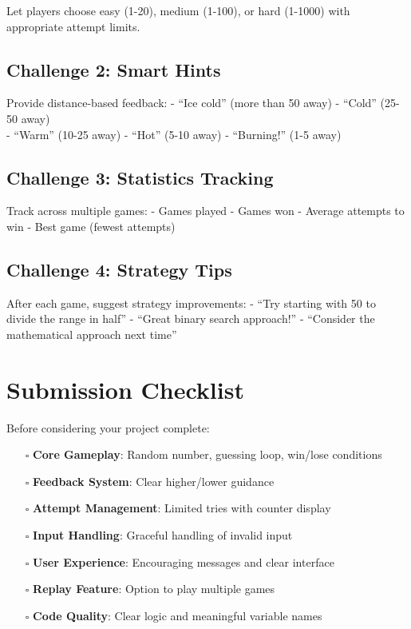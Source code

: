 \documentclass[
  letterpaper,
  DIV=11,
  numbers=noendperiod,
  oneside]{scrreprt}
\providecommand{\tightlist}{%
  \setlength{\itemsep}{0pt}\setlength{\parskip}{0pt}}\usepackage{longtable,booktabs,array}
\begin{document}
Let players choose easy (1-20), medium (1-100), or hard (1-1000) with
appropriate attempt limits.

\subsection{Challenge 2: Smart Hints}\label{challenge-2-smart-hints}

Provide distance-based feedback: - ``Ice cold'' (more than 50 away) -
``Cold'' (25-50 away)\\
- ``Warm'' (10-25 away) - ``Hot'' (5-10 away) - ``Burning!'' (1-5 away)

\subsection{Challenge 3: Statistics
Tracking}\label{challenge-3-statistics-tracking}

Track across multiple games: - Games played - Games won - Average
attempts to win - Best game (fewest attempts)

\subsection{Challenge 4: Strategy Tips}\label{challenge-4-strategy-tips}

After each game, suggest strategy improvements: - ``Try starting with 50
to divide the range in half'' - ``Great binary search approach!'' -
``Consider the mathematical approach next time''

\section{Submission Checklist}\label{submission-checklist-2}

Before considering your project complete:

\begin{itemize}
\tightlist
\item[$\square$]
  \textbf{Core Gameplay}: Random number, guessing loop, win/lose
  conditions
\item[$\square$]
  \textbf{Feedback System}: Clear higher/lower guidance
\item[$\square$]
  \textbf{Attempt Management}: Limited tries with counter display
\item[$\square$]
  \textbf{Input Handling}: Graceful handling of invalid input
\item[$\square$]
  \textbf{User Experience}: Encouraging messages and clear interface
\item[$\square$]
  \textbf{Replay Feature}: Option to play multiple games
\item[$\square$]
  \textbf{Code Quality}: Clear logic and meaningful variable names
\end{itemize}
\end{document}
